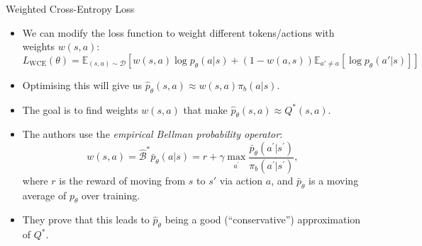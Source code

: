 \documentclass[aspectratio=169]{beamer}
\begin{document}
\begin{frame}{Weighted Cross-Entropy Loss}
    \begin{itemize}[<+->]
        \item We can modify the loss function to weight different tokens/actions with weights $w(s,a)$:
        $$L_{\text{WCE}}(\theta) = \mathbb{E}_{(s,a) \sim \mathcal{D}} \left[ w(s,a) \log p_\theta(a | s)  + (1-w(a,s)) \mathbb{E}_{a' \neq a}[\log p_\theta(a' | s)] \right]$$
        \item Optimising this will give us $\hat{p}_\theta(s,a) \approx w(s,a)\pi_b(a|s)$.%
        \item The goal is to find weights $w(s,a)$ that make $\hat{p}_\theta(s,a) \approx Q^*(s,a)$.
        \item The authors use the \textit{empirical Bellman probability operator}:
        $$w(s,a) = \hat{\mathcal{B}}^{*}\bar{p}_{\theta}(a|s) = r + \gamma\max_{a^{\prime}}\frac{\bar{p}_{\theta}(a^{\prime}|s^{\prime})}{\pi_{b}(a^{\prime}|s^{\prime})},$$
        where $r$ is the reward of moving from $s$ to $s'$ via action $a$, and $\bar{p}_{\theta}$ is a moving average of $p_{\theta}$ over training.
        \item They prove that this leads to $\hat{p}_\theta$ being a good (``conservative'') approximation of $Q^*$.
        
    \end{itemize}
  \end{frame}
\end{document}
